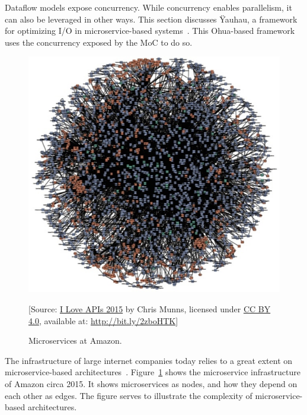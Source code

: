 Dataflow models expose concurrency. While concurrency enables parallelism, it can also be leveraged in other ways. 
This section discusses \"{Y}auhau, a framework for optimizing \ac{I/O} in microservice-based systems~\cite{ertel_cc18}.
This Ohua-based framework uses the concurrency exposed by the \ac{MoC} to do so.

\begin{figure}[t]
        \centering
        \includegraphics[scale=0.25]{figures/amazon-microservices.png}\\
        \small

        [Source: \href{https://www.slideshare.net/apigee/i-love-apis-2015-microservices-at-amazon-54487258}{I Love APIs 2015} by Chris Munns, licensed under \href{https://creativecommons.org/licenses/by/4.0/}{CC BY 4.0}, available at: \href{http://bit.ly/2zboHTK}{\url{http://bit.ly/2zboHTK}}]
        \vspace{-1mm}
        \caption{Microservices at Amazon.}
        \label{fig:amazon_death_star}
        \vspace{-3mm}
\end{figure}

The infrastructure of large internet companies today relies to a great extent on microservice-based architectures~\cite{decandia2007dynamo,marlow2014haxl}.
Figure~\ref{fig:amazon_death_star} shows the microservice infrastructure of Amazon circa 2015. 
It shows microservices as nodes, and how they depend on each other as edges.
The figure serves to illustrate the complexity of microservice-based architectures.

